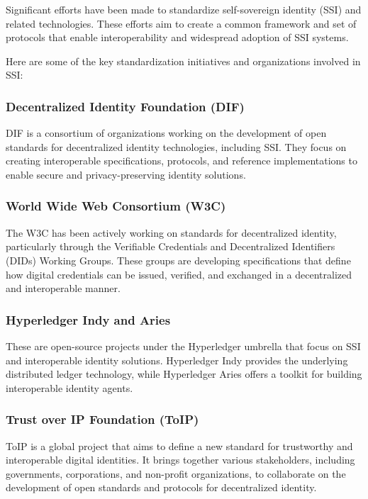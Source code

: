 
Significant efforts have been made to standardize self-sovereign identity (SSI) and related technologies. These efforts aim to create a common framework and set of protocols that enable interoperability and widespread adoption of SSI systems. 

\par Here are some of the key standardization initiatives and organizations involved in SSI:

\subsubsection{Decentralized Identity Foundation (DIF)} DIF is a consortium of organizations working on the development of open standards for decentralized identity technologies, including SSI. They focus on creating interoperable specifications, protocols, and reference implementations to enable secure and privacy-preserving identity solutions.

\subsubsection{World Wide Web Consortium (W3C)} The W3C has been actively working on standards for decentralized identity, particularly through the Verifiable Credentials and Decentralized Identifiers (DIDs) Working Groups. These groups are developing specifications that define how digital credentials can be issued, verified, and exchanged in a decentralized and interoperable manner.

\subsubsection{Hyperledger Indy and Aries} These are open-source projects under the Hyperledger umbrella that focus on SSI and interoperable identity solutions. Hyperledger Indy provides the underlying distributed ledger technology, while Hyperledger Aries offers a toolkit for building interoperable identity agents.

\subsubsection{Trust over IP Foundation (ToIP)} ToIP is a global project that aims to define a new standard for trustworthy and interoperable digital identities. It brings together various stakeholders, including governments, corporations, and non-profit organizations, to collaborate on the development of open standards and protocols for decentralized identity.

